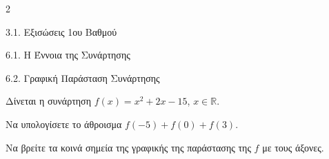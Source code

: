 \begin{ylh}{2}
    \item 3.1. Εξισώσεις 1ου Βαθμού
    \item 6.1. Η Έννοια της Συνάρτησης
    \item 6.2. Γραφική Παράσταση Συνάρτησης
\end{ylh}
Δίνεται η συνάρτηση $f(x) = x^2 + 2x - 15$, $x \in \mathbb{R}$.

\begin{alist}
\item Να υπολογίσετε το άθροισμα $f(-5) + f(0) + f(3)$.
\item Να βρείτε τα κοινά σημεία της γραφικής της παράστασης της $f$ με τους άξονες.
\end{alist}

